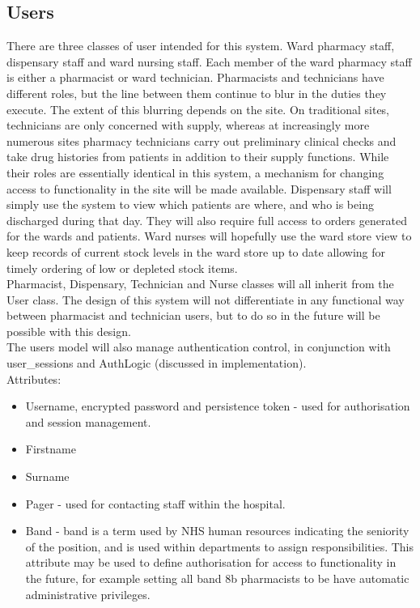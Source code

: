 \documentclass[letterpaper]{amsart}
\begin{document}
\subsection{Users}
There are three classes of user intended for this system.  Ward pharmacy staff, dispensary staff and ward nursing staff.  Each member of the ward pharmacy staff is either a pharmacist or ward technician.  Pharmacists and technicians have different roles, but the line between them continue to blur in the duties they execute.  The extent of this blurring depends on the site.  On traditional sites, technicians are only concerned with supply, whereas at increasingly more numerous sites pharmacy technicians carry out preliminary clinical checks and take drug histories from patients in addition to their supply functions.  While their roles are essentially identical in this system, a mechanism for changing access to functionality in the site will be made available.  Dispensary staff will simply use the system to view which patients are where, and who is being discharged during that day.  They will also require full access to orders generated for the wards and patients.  Ward nurses will hopefully use the ward store view to keep records of current stock levels in the ward store up to date allowing for timely ordering of low or depleted stock items.\\ 
Pharmacist, Dispensary, Technician and Nurse classes will all inherit from the User class. The design of this system will not differentiate in any functional way between pharmacist and technician users, but to do so in the future will be possible with this design.\\
The users model will also manage authentication control, in conjunction with user\_sessions and AuthLogic (discussed in implementation).\\
Attributes:
\begin{itemize}
    \item Username, encrypted password and persistence token - used for authorisation and session management.
    \item Firstname 
    \item Surname 
    \item Pager - used for contacting staff within the hospital.
    \item Band - band is a term used by NHS human resources indicating the seniority of the position, and is used within departments to assign responsibilities.  This attribute may be used to define authorisation for access to functionality in the future, for example setting all band 8b pharmacists to be have automatic administrative privileges. 
\end{itemize}
\end{document}
